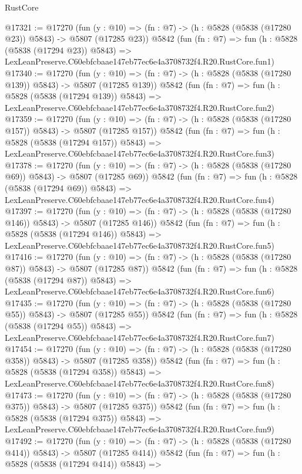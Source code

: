 \begin{lexlean}{RustCore}
\begin{coremodule}
@17321 := @17270
    (fun (y : @10) => (fn : @7) -> (h : @5828 (@5838 (@17280 @23)) @5843) -> @5807 (@17285 @23))
    @5842
    (fun (fn : @7) =>
    fun (h : @5828 (@5838 (@17294 @23)) @5843) =>
    LexLeanPreserve.C60ebfcbaae147eb77ec6e4a3708732f4.R20.RustCore.fun1)
@17340 := @17270
    (fun (y : @10) => (fn : @7) -> (h : @5828 (@5838 (@17280 @139)) @5843) -> @5807 (@17285 @139))
    @5842
    (fun (fn : @7) =>
    fun (h : @5828 (@5838 (@17294 @139)) @5843) =>
    LexLeanPreserve.C60ebfcbaae147eb77ec6e4a3708732f4.R20.RustCore.fun2)
@17359 := @17270
    (fun (y : @10) => (fn : @7) -> (h : @5828 (@5838 (@17280 @157)) @5843) -> @5807 (@17285 @157))
    @5842
    (fun (fn : @7) =>
    fun (h : @5828 (@5838 (@17294 @157)) @5843) =>
    LexLeanPreserve.C60ebfcbaae147eb77ec6e4a3708732f4.R20.RustCore.fun3)
@17378 := @17270
    (fun (y : @10) => (fn : @7) -> (h : @5828 (@5838 (@17280 @69)) @5843) -> @5807 (@17285 @69))
    @5842
    (fun (fn : @7) =>
    fun (h : @5828 (@5838 (@17294 @69)) @5843) =>
    LexLeanPreserve.C60ebfcbaae147eb77ec6e4a3708732f4.R20.RustCore.fun4)
@17397 := @17270
    (fun (y : @10) => (fn : @7) -> (h : @5828 (@5838 (@17280 @146)) @5843) -> @5807 (@17285 @146))
    @5842
    (fun (fn : @7) =>
    fun (h : @5828 (@5838 (@17294 @146)) @5843) =>
    LexLeanPreserve.C60ebfcbaae147eb77ec6e4a3708732f4.R20.RustCore.fun5)
@17416 := @17270
    (fun (y : @10) => (fn : @7) -> (h : @5828 (@5838 (@17280 @87)) @5843) -> @5807 (@17285 @87))
    @5842
    (fun (fn : @7) =>
    fun (h : @5828 (@5838 (@17294 @87)) @5843) =>
    LexLeanPreserve.C60ebfcbaae147eb77ec6e4a3708732f4.R20.RustCore.fun6)
@17435 := @17270
    (fun (y : @10) => (fn : @7) -> (h : @5828 (@5838 (@17280 @55)) @5843) -> @5807 (@17285 @55))
    @5842
    (fun (fn : @7) =>
    fun (h : @5828 (@5838 (@17294 @55)) @5843) =>
    LexLeanPreserve.C60ebfcbaae147eb77ec6e4a3708732f4.R20.RustCore.fun7)
@17454 := @17270
    (fun (y : @10) => (fn : @7) -> (h : @5828 (@5838 (@17280 @358)) @5843) -> @5807 (@17285 @358))
    @5842
    (fun (fn : @7) =>
    fun (h : @5828 (@5838 (@17294 @358)) @5843) =>
    LexLeanPreserve.C60ebfcbaae147eb77ec6e4a3708732f4.R20.RustCore.fun8)
@17473 := @17270
    (fun (y : @10) => (fn : @7) -> (h : @5828 (@5838 (@17280 @375)) @5843) -> @5807 (@17285 @375))
    @5842
    (fun (fn : @7) =>
    fun (h : @5828 (@5838 (@17294 @375)) @5843) =>
    LexLeanPreserve.C60ebfcbaae147eb77ec6e4a3708732f4.R20.RustCore.fun9)
@17492 := @17270
    (fun (y : @10) => (fn : @7) -> (h : @5828 (@5838 (@17280 @414)) @5843) -> @5807 (@17285 @414))
    @5842
    (fun (fn : @7) =>
    fun (h : @5828 (@5838 (@17294 @414)) @5843) =>

\end{coremodule}
\end{lexlean}
